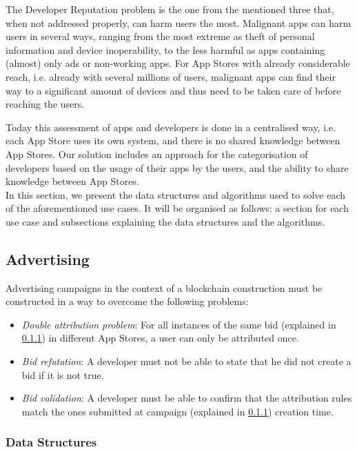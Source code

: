 The Developer Reputation problem is the one from the mentioned three that, when not addressed properly, can harm users the most. Malignant apps can harm users in several ways, ranging from the most extreme as theft of personal information and device inoperability, to the less harmful as apps containing (almost) only ads or non-working apps. For App Stores with already considerable reach, i.e. already with several millions of users, malignant apps can find their way to a significant amount of devices and thus need to be taken care of before reaching the users.

Today this assessment of apps and developers is done in a centralised way, i.e. each App Store uses its own system, and there is no shared knowledge between App Stores. Our solution includes an approach for the categorisation of developers based on the usage of their apps by the users, and the ability to share knowledge between App Stores.\\

In this section, we present the data structures and algorithms used to solve each of the aforementioned use cases. It will be organised as follows: a section for each use case and subsections explaining the data structures and the algorithms.

\subsection{Advertising}

Advertising campaigns in the context of a blockchain construction must be constructed in a way to overcome the following problems:
\begin{itemize}
\item \textit{Double attribution problem}: For all instances of the same bid (explained in \ref{sssec:ads_ds}) in different App Stores, a user can only be attributed once.
\item \textit{Bid refutation}: A developer must not be able to state that he did not create a bid if it is not true.
\item \textit{Bid validation}: A developer must be able to confirm that the attribution rules match the ones submitted at campaign (explained in \ref{sssec:ads_ds}) creation time.
\end{itemize}

\subsubsection{Data Structures} \label{sssec:ads_ds}

